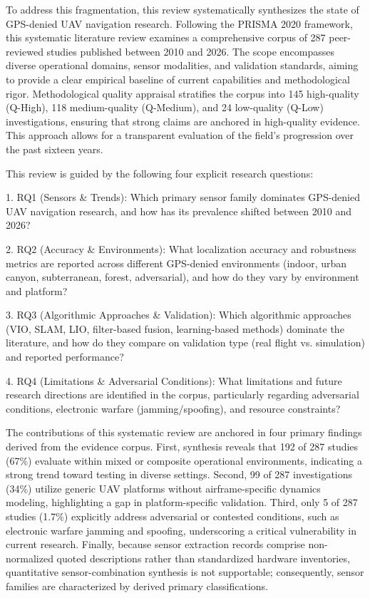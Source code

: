 \documentclass[conference]{IEEEtran}
\begin{document}
To address this fragmentation, this review systematically synthesizes the state of GPS-denied UAV navigation research. Following the PRISMA 2020 framework, this systematic literature review examines a comprehensive corpus of 287 peer-reviewed studies published between 2010 and 2026. The scope encompasses diverse operational domains, sensor modalities, and validation standards, aiming to provide a clear empirical baseline of current capabilities and methodological rigor. Methodological quality appraisal stratifies the corpus into 145 high-quality (Q-High), 118 medium-quality (Q-Medium), and 24 low-quality (Q-Low) investigations, ensuring that strong claims are anchored in high-quality evidence. This approach allows for a transparent evaluation of the field's progression over the past sixteen years.


This review is guided by the following four explicit research questions:

1. RQ1 (Sensors \& Trends): Which primary sensor family dominates GPS-denied UAV navigation research, and how has its prevalence shifted between 2010 and 2026?

2. RQ2 (Accuracy \& Environments): What localization accuracy and robustness metrics are reported across different GPS-denied environments (indoor, urban canyon, subterranean, forest, adversarial), and how do they vary by environment and platform?

3. RQ3 (Algorithmic Approaches \& Validation): Which algorithmic approaches (VIO, SLAM, LIO, filter-based fusion, learning-based methods) dominate the literature, and how do they compare on validation type (real flight vs. simulation) and reported performance?

4. RQ4 (Limitations \& Adversarial Conditions): What limitations and future research directions are identified in the corpus, particularly regarding adversarial conditions, electronic warfare (jamming/spoofing), and resource constraints?


The contributions of this systematic review are anchored in four primary findings derived from the evidence corpus. First, synthesis reveals that 192 of 287 studies (67\%) evaluate within mixed or composite operational environments, indicating a strong trend toward testing in diverse settings. Second, 99 of 287 investigations (34\%) utilize generic UAV platforms without airframe-specific dynamics modeling, highlighting a gap in platform-specific validation. Third, only 5 of 287 studies (1.7\%) explicitly address adversarial or contested conditions, such as electronic warfare jamming and spoofing, underscoring a critical vulnerability in current research. Finally, because sensor extraction records comprise non-normalized quoted descriptions rather than standardized hardware inventories, quantitative sensor-combination synthesis is not supportable; consequently, sensor families are characterized by derived primary classifications. 
\end{document}
